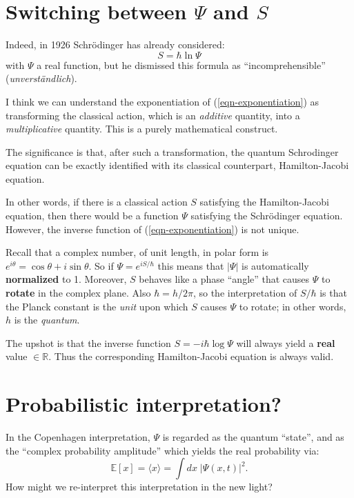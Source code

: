 \section{Switching between $\Psi$ and $S$}

Indeed, in 1926 Schr\"odinger \parencite{Schrodinger1926} has already considered:
\begin{equation}
S = \hbar \ln \Psi
\end{equation}
with $\Psi$ a real function, but he dismissed this formula as ``incomprehensible'' (\textit{unverst\"andlich}).

I think we can understand the exponentiation of (\ref{eqn-exponentiation}) as transforming the classical action, which is an \textit{additive} quantity, into a \textit{multiplicative} quantity.  This is a purely mathematical construct.

The significance is that, after such a transformation, the quantum Schrodinger equation can be exactly identified with its classical counterpart, Hamilton-Jacobi equation.

In other words, if there is a classical action $S$ satisfying the Hamilton-Jacobi equation, then there would be a function $\Psi$ satisfying the Schr\"odinger equation.  However, the inverse function of (\ref{eqn-exponentiation}) is not unique.

Recall that a complex number, of unit length, in polar form is $e^{i \theta} = \cos \theta + i \sin \theta$.  So if $\Psi = e^{i S / \hbar}$ this means that $| \Psi |$ is automatically \textbf{normalized} to 1.  Moreover, $S$ behaves like a phase ``angle'' that causes $\Psi$ to \textbf{rotate} in the complex plane.  Also $\hbar = h / 2 \pi$, so the interpretation of $S / \hbar$ is that the Planck constant is the \textit{unit} upon which $S$ causes $\Psi$ to rotate;  in other words, $h$ is the \textit{quantum}.

The upshot is that the inverse function $S = - i \hbar \log \Psi$ will always yield a \textbf{real} value $\in \mathbb{R}$.  Thus the corresponding Hamilton-Jacobi equation is always valid.

\section{Probabilistic interpretation?}

In the Copenhagen interpretation, $\Psi$ is regarded as the quantum ``state'', and as the ``complex probability amplitude'' which yields the real probability via:
\begin{equation}
\mathbb{E} [ x ]
= \langle x \rangle
= \int dx \; | \Psi(x, t) |^2 .
\end{equation}
How might we re-interpret this interpretation in the new light?


